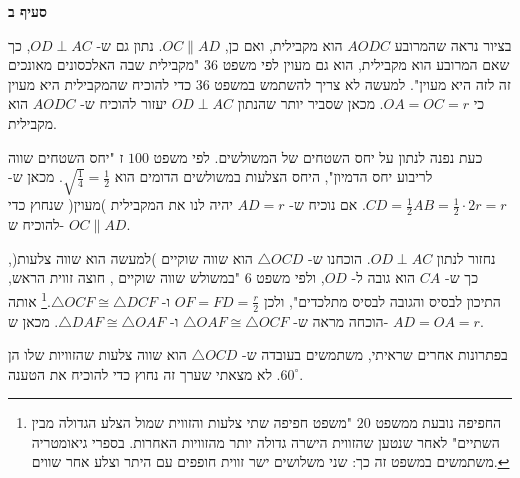 \documentclass[12pt,a4paper]{article}
\begin{document}
\textbf{סעיף ב}

בציור נראה שהמרובע
$AODC$
הוא מקבילית, ואם כן, 
$OC\|AD$.
נתון גם ש-%
$OD\perp AC$,
כך שאם המרובע הוא מקבילית, הוא גם מעוין לפי משפט
$36$
"מקבילית שבה האלכסונים מאונכים זה לזה היא מעוין". למעשה לא צריך להשתמש במשפט
$36$
כדי להוכיח שהמקבילית היא מעוין כי 
$OA=OC=r$.
מכאן שסביר יותר שהנתון
$OD\perp AC$
יעזור להוכיח ש-%
$AODC$
הוא מקבילית.

כעת נפנה לנתון על יחס השטחים של המשולשים. לפי משפט
$100$%
ז "יחס השטחים שווה לריבוע יחס הדמיון", היחס הצלעות במשולשים הדומים הוא
$\sqrt{\frac{1}{4}}=\frac{1}{2}$.
מכאן ש-%
$CD=\frac{1}{2}AB=\frac{1}{2}\cdot 2r=r$.
אם נוכיח ש-%
$AD=r$
יהיה לנו את המקבילית )מעוין( שנחוץ כדי להוכיח ש-%
$OC\|AD$.

נחזור לנתון
$OD\perp AC$.
הוכחנו ש-%
$\triangle OCD$
הוא שווה שוקיים )למעשה הוא שווה צלעות(, כך ש-%
$CA$
הוא גובה ל-%
$OD$,
ולפי משפט
$6$
"במשולש שווה שוקיים , חוצה זווית הראש, התיכון לבסיס והגובה לבסיס מתלכדים", ולכן
$OF=FD=\frac{r}{2}$
ו-%
$\triangle OCF\cong\triangle DCF$.\footnote{%
החפיפה נובעת ממשפט 
$20$
"משפט חפיפה שתי צלעות והזווית שמול הצלע הגדולה מבין השתיים" לאחר שנטען שהזווית הישרה גדולה יותר מהזוויות האחרות. בספרי גיאומטריה משתמשים במשפט זה כך: שני משלושים ישר זווית חופפים עם היתר וצלע אחר שווים.%
}
אותה הוכחה מראה ש-%
$\triangle OAF\cong \triangle OCF$
ו-%
$\triangle DAF\cong \triangle OAF$.
מכאן ש-%
$AD=OA=r$.
\begin{center}
\end{center}
בפתרונות אחרים שראיתי, משתמשים בעובדה ש-%
$\triangle OCD$
הוא שווה צלעות שהזוויות שלו הן
$60^\circ$.
לא מצאתי שערך זה נחוץ כדי להוכיח את הטענה.
\end{document}
